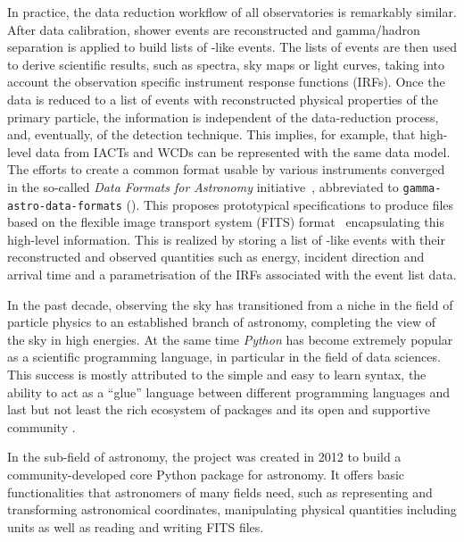 \documentclass[longauth]{aa}
\begin{document}
In practice, the data reduction workflow of all \gammaray observatories
is remarkably similar. After data calibration, shower events are reconstructed and
gamma/hadron separation is applied to build lists of \gammaray-like events.
The lists of \gammaray events are then used to derive scientific results, such as spectra, sky maps
or light curves, taking into account the observation specific instrument response functions (IRFs).
Once the data is reduced to a list of events with reconstructed physical properties of the primary particle,
the information is independent of the data-reduction process, and, eventually, of the detection technique. This implies,
for example, that high-level data from IACTs and WCDs can be represented
with the same data model.
The efforts to create a common format usable by various instruments
converged in the so-called \textit{Data Formats for \gammaray Astronomy}
initiative~\citep{gadf_proc,gadf_universe}, abbreviated to
\texttt{gamma-astro-data-formats} (\gadf). This proposes prototypical
specifications to produce files based on the flexible image transport system
(FITS) format~\citep{fits} encapsulating this high-level information. This is
realized by storing a list of \gammaray-like events with their reconstructed and observed
quantities such as energy, incident direction and arrival time and a parametrisation of
the IRFs associated with the event list data. %

In the past decade, observing the \gammaray sky has transitioned from a niche in the field of
particle physics to an established branch of astronomy, completing the view of the
sky in high energies. At the same time \textit{Python}
has become extremely popular as a scientific programming language,
in particular in the field of data sciences. This success is
mostly attributed to the simple and easy to learn syntax, the ability to act as
a \enquote{glue} language between different programming languages and last but not least
the rich ecosystem of packages and its open and supportive community \citep{Momcheva2015}.

In the sub-field of astronomy, the \astropy project \citep{astropy} was created in 2012
to build a community-developed core Python package for astronomy.
It offers basic functionalities that astronomers of many fields need, such as representing
and transforming astronomical coordinates, manipulating physical quantities including units
as well as reading and writing FITS files.
\end{document}
